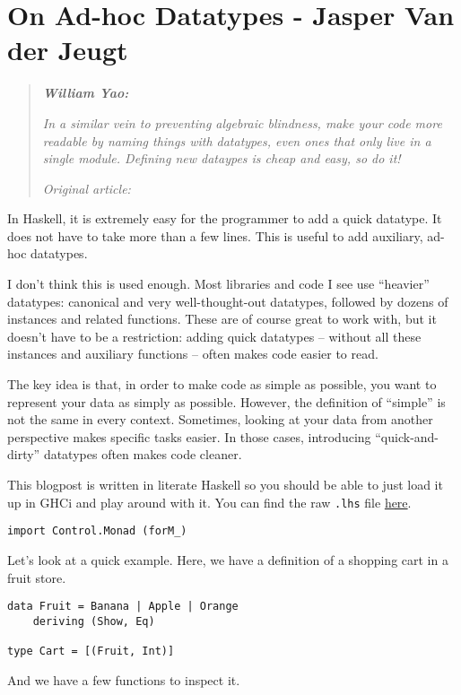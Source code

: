 \chapter{On Ad-hoc Datatypes - Jasper Van der Jeugt}
\label{sec:adhoc_datatypes}

\begin{quotation}
\noindent\textit{\textbf{William Yao:}}

\textit{In a similar vein to preventing algebraic blindness, make your code more readable by naming things with datatypes, even ones that only live in a single module. Defining new dataypes is cheap and easy, so do it!}

\vspace{\baselineskip}
\noindent\textit{Original article: \cite{on_adhoc_datatypes}}
\end{quotation}
In Haskell, it is extremely easy for the programmer to add a quick datatype. It does not have to take more than a few lines. This is useful to add auxiliary, ad-hoc datatypes.

I don't think this is used enough. Most libraries and code I see use ``heavier'' datatypes: canonical and very well-thought-out datatypes, followed by dozens of instances and related functions. These are of course great to work with, but it doesn't have to be a restriction: adding quick datatypes -- without all these instances and auxiliary functions -- often makes code easier to read.

The key idea is that, in order to make code as simple as possible, you want to represent your data as simply as possible. However, the definition of ``simple'' is not the same in every context. Sometimes, looking at your data from another perspective makes specific tasks easier. In those cases, introducing ``quick-and-dirty'' datatypes often makes code cleaner.

This blogpost is written in literate Haskell so you should be able to just load it up in GHCi and play around with it. You can find the raw \texttt{.lhs} file \href{https://github.com/jaspervdj/jaspervdj/raw/master/posts/2016-05-11-ad-hoc-datatypes.lhs}{here}.

\begin{verbatim}
import Control.Monad (forM_)
\end{verbatim}
Let's look at a quick example. Here, we have a definition of a shopping cart in a fruit store.

\begin{verbatim}
data Fruit = Banana | Apple | Orange
    deriving (Show, Eq)

type Cart = [(Fruit, Int)]
\end{verbatim}
And we have a few functions to inspect it.

